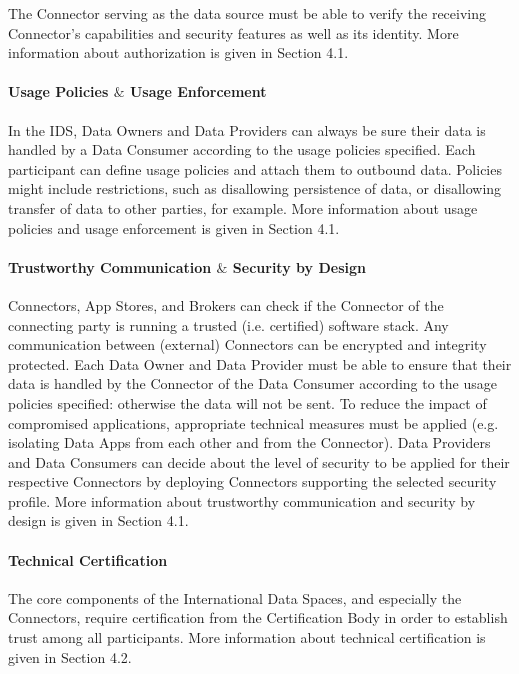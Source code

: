 The Connector serving as the data source must be able to verify the receiving Connector’s capabilities and security features as well as its identity. More information about authorization is given in Section 4.1. %

\paragraph{Usage Policies $\&$  Usage Enforcement\\}
In the IDS, Data Owners and Data Providers can always be sure their data is handled by a Data Consumer according to the usage policies specified. Each participant can define usage policies and attach them to outbound data. Policies might include restrictions, such as disallowing persistence of data, or disallowing transfer of data to other parties, for example. More information about usage policies and usage enforcement is given in Section 4.1. %

\paragraph{Trustworthy Communication $\&$  Security by Design\\}
Connectors, App Stores, and Brokers can check if the Connector of the connecting party is running a trusted (i.e. certified) software stack. Any communication between (external) Connectors can be encrypted and integrity protected. Each Data Owner and Data Provider must be able to ensure that their data is handled by the Connector of the Data Consumer according to the usage policies specified: otherwise the data will not be sent. To reduce the impact of compromised applications, appropriate technical measures must be applied (e.g. isolating Data Apps from each other and from the Connector). Data Providers and Data Consumers can decide about the level of security to be applied for their respective Connectors by deploying Connectors supporting the selected security profile. More information about trustworthy communication and security by design is given in Section 4.1. %


\paragraph{Technical Certification\\}
The core components of the International Data Spaces, and especially the Connectors, require certification from the Certification Body in order to establish trust among all participants. More information about technical certification is given in Section 4.2. %


